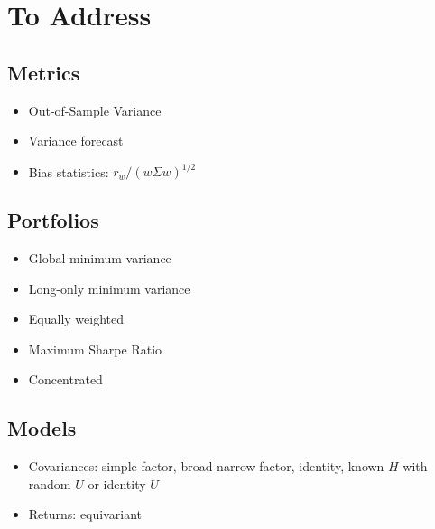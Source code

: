 \documentclass{article}
\begin{document}



\section{To Address}

\subsection{Metrics}

\begin{itemize}
	\item Out-of-Sample Variance
	\item Variance forecast
	\item Bias statistics: $r_w / (w\Sigma w)^{1/2}$
\end{itemize}

\subsection{Portfolios}

\begin{itemize}
	\item Global minimum variance
	\item Long-only minimum variance
	\item Equally weighted
	\item Maximum Sharpe Ratio
	\item Concentrated
\end{itemize}

\subsection{Models}

\begin{itemize}
	\item Covariances: simple factor, broad-narrow factor, identity, known $H$ with random $U$ or identity $U$
	\item Returns: equivariant
\end{itemize}
\end{document}
